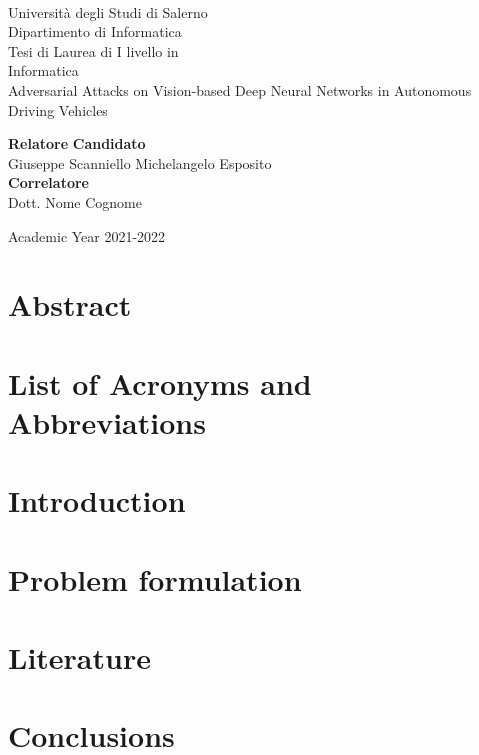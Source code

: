 \documentclass[11pt,oneside]{book}
\theoremstyle{definition}
\begin{document}
    \begin{titlepage}
        \begin{center}
            \\[0.2truecm]
            {\Large Universit\`a degli Studi di Salerno}\\[0.2truecm]
            {\large Dipartimento di Informatica}\\
            \hrulefill
            \vfill
            {\large Tesi di Laurea di I livello in }\\[0.2truecm]
            {\Large Informatica}\\
            \vfill\vfill
            {\Huge Adversarial Attacks on Vision-based Deep Neural Networks in Autonomous Driving Vehicles}
            \vfill\vfill
            
            
            {\bf Relatore} \hfill {\bf Candidato}\ \ \\
            Giuseppe Scanniello \hfill Michelangelo Esposito\\
            {\bf Correlatore} \hfill {\bf }\ \ \\
            Dott. Nome Cognome \hfill \ \ \\
            
            \vfill
            \hrulefill 
            
            Academic Year 2021-2022
        
        \end{center}
    \end{titlepage}


    \chapter*{Abstract}
    
    
    \tableofcontents
    \pagestyle{plain}

    

    \chapter*{List of Acronyms and Abbreviations}
    

    \chapter{Introduction}
    \setcounter{page}{1} 	%
    

    \chapter{Problem formulation}
    

    \chapter{Literature}
    

    \chapter{Conclusions}
    

    \nocite{*}
    \printbibliography[title={Bibliography}] 
\end{document}
